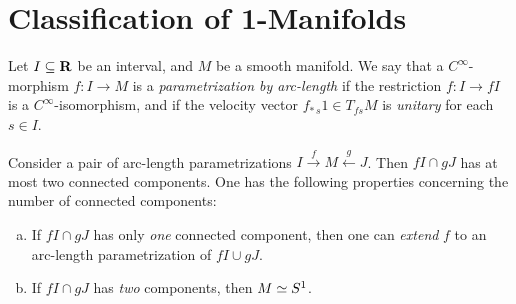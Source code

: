 \section{Classification of 1-Manifolds}

\begin{definition}
    \label{def:parametrization-by-arc-length}
    Let \(I \subseteq \mathbf{R}\) be an interval, and \(M\) be a smooth manifold. We say that a
    \(C^{\infty}\)-morphism \(f: I \to M\) is a \emph{parametrization by arc-length} if the
    restriction \(f: I \to f I\) is a \(C^{\infty}\)-isomorphism, and if the velocity
    vector \(f_{*\, s} 1 \in T_{f s} M\) is \emph{unitary} for each \(s \in I\).
\end{definition}

\begin{lemma}
    \label{lem:image-components-arc-len-parametrization}
    Consider a pair of arc-length parametrizations
    \(I \xrightarrow f M \xleftarrow g J\). Then \(f I \cap g J\) has at most two
    connected components. One has the following properties concerning the number of
    connected components:
    \begin{enumerate}[(a)]\setlength\itemsep{0em}
        \item If \(f I \cap g J\) has only \emph{one} connected component, then one can
              \emph{extend} \(f\) to an arc-length parametrization of \(f I \cup g J\).
        \item If \(f I \cap g J\) has \emph{two} components, then \(M \simeq S^1\).
    \end{enumerate}
\end{lemma}

